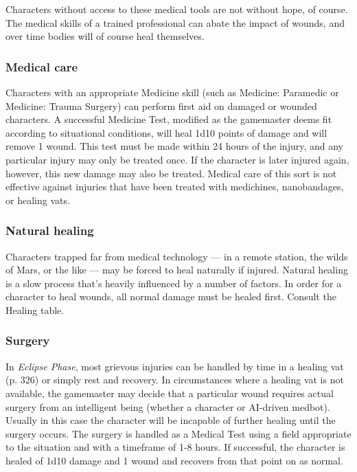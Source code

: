 Characters without access to these medical tools are not without hope, of course. The medical skills of a trained professional can abate the impact of wounds, and over time bodies will of course heal themselves. 

\subsubsection{Medical care} 

Characters with an appropriate Medicine skill (such as Medicine: Paramedic or Medicine: Trauma Surgery) can perform first aid on damaged or wounded characters. A successful Medicine Test, modified as the gamemaster deems fit according to situational conditions, will heal 1d10 points of damage and will remove 1 wound. This test must be made within 24 hours of the injury, and any particular injury may only be treated once. If the character is later injured again, however, this new damage may also be treated. Medical care of this sort is not effective against injuries that have been treated with medichines, nanobandages, or healing vats. 

\subsubsection{Natural healing} 

Characters trapped far from medical technology --- in a remote station, the wilds of Mars, or the like --- may be forced to heal naturally if injured. Natural healing is a slow process that’s heavily influenced by a number of factors. In order for a character to heal wounds, all normal damage must be healed first. Consult the Healing table. 

\subsubsection{Surgery} 

In \emph{Eclipse Phase}, most grievous injuries can be handled by time in a healing vat (p. 326) or simply rest and recovery. In circumstances where a healing vat is not available, the gamemaster may decide that a particular wound requires actual surgery from an intelligent being (whether a character or AI-driven medbot). Usually in this case the character will be incapable of further healing until the surgery occurs. The surgery is handled as a Medical Test using a field appropriate to the situation and with a timeframe of 1-8 hours. If successful, the character is healed of 1d10 damage and 1 wound and recovers from that point on as normal. 

